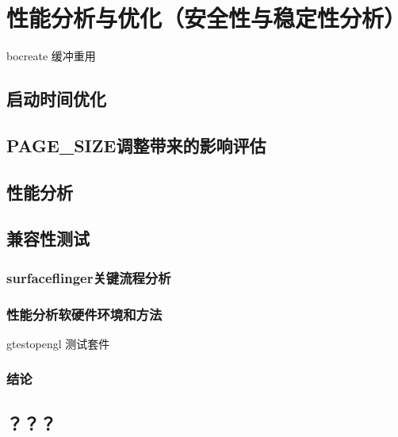 
\chapter{性能分析与优化（安全性与稳定性分析）}
bocreate 缓冲重用
\section{启动时间优化}

\section{PAGE\_SIZE调整带来的影响评估}

\section{性能分析}

\section{兼容性测试}

\subsection{surfaceflinger关键流程分析}

\subsection{性能分析软硬件环境和方法} gtestopengl 测试套件

\subsection{结论}

\section{？？？}

